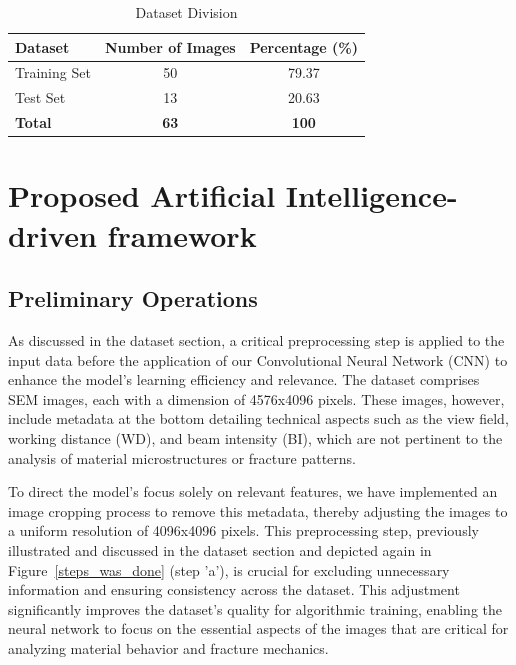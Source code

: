 \documentclass[preprint,12pt]{elsarticle}
\begin{document}
\begin{table}[htbp]
\centering
\small %
\caption{Dataset Division}
\label{tab:dataset_division}
\begin{tabular}{@{}lcc@{}}
\toprule
\textbf{Dataset} & \textbf{Number of Images} & \textbf{Percentage (\%)} \\ \midrule
Training Set & 50 & 79.37 \\
Test Set & 13 & 20.63 \\ \bottomrule
\textbf{Total} & \textbf{63} & \textbf{100} \\ \bottomrule
\end{tabular}
\end{table}


\vspace{\baselineskip}
\vspace{\baselineskip}
\vspace{\baselineskip}




\section{Proposed Artificial Intelligence-driven framework}
\label{Sec: Proposed Artificial intelligence-driven framework}
\subsection{Preliminary Operations}
\label{sec:prelimnary_operations}
As discussed in the dataset section, a critical preprocessing step is applied to the input data before the application of our Convolutional Neural Network (CNN) to enhance the model's learning efficiency and relevance. The dataset comprises SEM images, each with a dimension of 4576x4096 pixels. These images, however, include metadata at the bottom detailing technical aspects such as the view field, working distance (WD), and beam intensity (BI), which are not pertinent to the analysis of material microstructures or fracture patterns.

To direct the model's focus solely on relevant features, we have implemented an image cropping process to remove this metadata, thereby adjusting the images to a uniform resolution of 4096x4096 pixels. This preprocessing step, previously illustrated and discussed in the dataset section and depicted again in Figure~\ref{steps_was_done} (step 'a'), is crucial for excluding unnecessary information and ensuring consistency across the dataset. This adjustment significantly improves the dataset's quality for algorithmic training, enabling the neural network to focus on the essential aspects of the images that are critical for analyzing material behavior and fracture mechanics.
\end{document}
